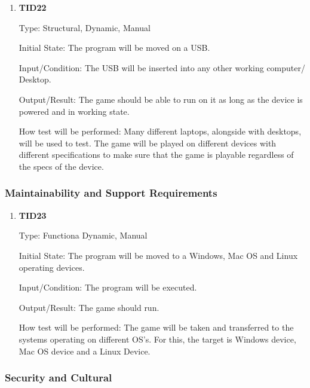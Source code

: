 \documentclass[12pt, titlepage]{article}
\begin{document}
\begin{enumerate}
	
	\item{\textbf{TID22}\\}
	
	Type: Structural, Dynamic, Manual
	
	Initial State: The program will be moved on a USB.
	
	Input/Condition: The USB will be inserted into any other working computer/ Desktop.
	
	Output/Result: The game should be able to run on it as long as the device is powered and in working state.
	
	How test will be performed: Many different laptops, alongside with desktops, will be used to test. The game will be played on different devices with different specifications to make sure that the game is playable regardless of the specs of the device.
	
	
\end{enumerate}

\subsubsection{Maintainability and Support Requirements}

\begin{enumerate}
	
	\item{\textbf{TID23}\\}
	
	Type: Functiona Dynamic, Manual
	
	Initial State: The program will be moved to a Windows, Mac OS and Linux operating devices.
	
	Input/Condition: The program will be executed.
	
	Output/Result: The game should run.
	
	How test will be performed: The game will be taken and transferred to the systems operating on different OS's. For this, the target is Windows device, Mac OS device and a Linux Device. 
	
	
\end{enumerate}

\subsubsection{Security and Cultural}
\end{document}
